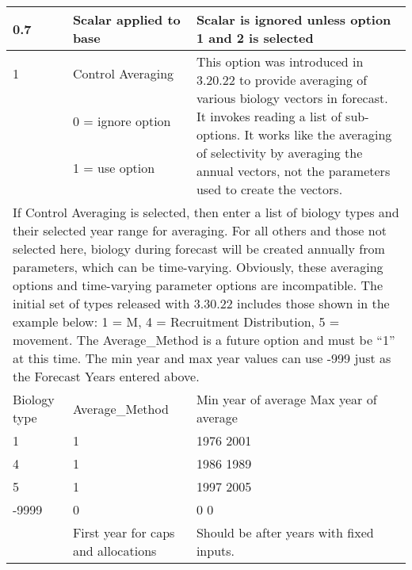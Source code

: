 \begin{landscape}
{\begin{longtable}{p{3.2cm} p{7cm} p{10.8cm}}
  \hline
  0.7 \Tstrut & Scalar applied to base & \multirow{1}{1cm}[-0.05cm]{\parbox{11cm}{Scalar is ignored unless option 1 and 2 is selected}} \Bstrut\\

  \hline
  1 & Control Averaging & \multirow{4}{1cm}{\parbox{11cm}{This option was introduced in 3.20.22 to provide averaging of various biology vectors in forecast. It invokes reading a list of sub-options. It works like the averaging of selectivity by averaging the annual vectors, not the parameters used to create the vectors.}} \Tstrut\\
    & 0 = ignore option & \\
    & 1 = use option & \\
    & & \\ 

  \hline
  \multicolumn{3}{l}{\multirow{5}{1cm}{\parbox{22cm}{If Control Averaging is selected, then enter a list of biology types and their selected year range for averaging. For all others and those not selected here, biology during forecast will be created annually from parameters, which can be time-varying. Obviously, these averaging options and time-varying parameter options are incompatible. The initial set of types released with 3.30.22 includes those shown in the example below: 1 = M, 4 = Recruitment Distribution, 5 = movement. The Average\_Method is a future option and must be ``1'' at this time. The min year and max year values can use -999 just as the Forecast Years entered above.}}} \\
    & & \\
    & & \\
    & & \\ 
    & & \\

  \hline
  Biology type & Average\_Method & Min year of average \hspace{6mm} Max year of average \Tstrut\\
  1 & 1 & 1976 \hspace{30mm} 2001 \\
  4 & 1 & 1986 \hspace{30mm} 1989 \\
  5 & 1 & 1997 \hspace{30mm} 2005 \\
  -9999 & 0 & 0 \hspace{36mm} 0 \Bstrut\\

  \pagebreak
  2015 \Tstrut & First year for caps and allocations & \multirow{1}{1cm}[-0.10cm]{\parbox{11cm}{Should be after years with fixed inputs.}} \Bstrut\\


\end{longtable}}
\end{landscape}
